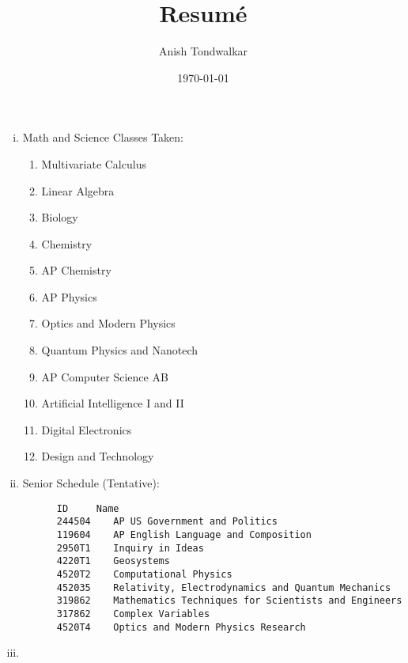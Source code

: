\documentclass[11pt,notitlepage]{article}
\title{Resum\'e}
\author{Anish Tondwalkar}
\date{\today}
\begin{document}
\maketitle
\begin{enumerate}[i)]
  \item Math and Science Classes Taken: 
    \begin{enumerate}
    \item Multivariate Calculus
    \item Linear Algebra
    \item Biology
    \item Chemistry
    \item AP Chemistry
    \item AP Physics
    \item Optics and Modern Physics
    \item Quantum Physics and Nanotech
    \item AP Computer Science AB
    \item Artificial Intelligence I and II
    \item Digital Electronics
    \item Design and Technology  
  \end{enumerate}
  \item Senior Schedule (Tentative): 
\begin{verbatim}
      ID     Name	
      244504	AP US Government and Politics
      119604	AP English Language and Composition
      2950T1	Inquiry in Ideas
      4220T1	Geosystems
      4520T2	Computational Physics
      452035	Relativity, Electrodynamics and Quantum Mechanics
      319862	Mathematics Techniques for Scientists and Engineers
      317862	Complex Variables
      4520T4	Optics and Modern Physics Research
\end{verbatim}
  \item 
\end{enumerate}
\end{document}
